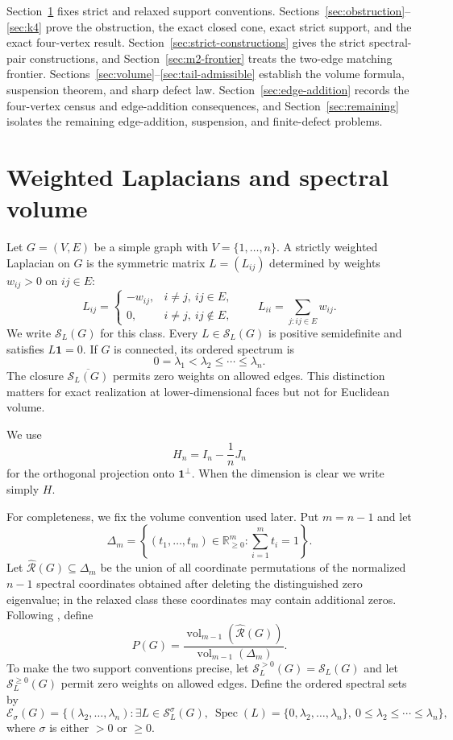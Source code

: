 \documentclass[11pt,reqno]{amsart}
\theoremstyle{definition}
\theoremstyle{remark}
\newcommand{\one}{\mathbf 1}
\newcommand{\R}{\mathbb R}
\newcommand{\SL}{\mathcal S_L}
\newcommand{\Spec}{\operatorname{Spec}}
\begin{document}
Section~\ref{sec:prelim} fixes strict and relaxed support conventions.
Sections~\ref{sec:obstruction}--\ref{sec:k4} prove the obstruction, the
exact closed cone, exact strict support, and the exact four-vertex result.
Section~\ref{sec:strict-constructions} gives the strict spectral-pair
constructions, and Section~\ref{sec:m2-frontier} treats the two-edge matching
frontier.
Sections~\ref{sec:volume}--\ref{sec:tail-admissible} establish the volume
formula, suspension theorem, and sharp defect law.  Section~\ref{sec:edge-addition}
records the four-vertex census and edge-addition consequences, and
Section~\ref{sec:remaining} isolates the remaining edge-addition,
suspension, and finite-defect problems.

\section{Weighted Laplacians and spectral volume}\label{sec:prelim}

Let $G=(V,E)$ be a simple graph with $V=\{1,\ldots,n\}$.  A strictly
weighted Laplacian on $G$ is the symmetric matrix $L=(L_{ij})$ determined by
weights $w_{ij}>0$ on $ij\in E$:
\[
  L_{ij}=
  \begin{cases}
    -w_{ij},&i\ne j,\ ij\in E,\\
    0,&i\ne j,\ ij\notin E,
  \end{cases}
  \qquad
  L_{ii}=\sum_{j:ij\in E}w_{ij}.
\]
We write $\SL(G)$ for this class.  Every $L\in\SL(G)$ is positive
semidefinite and satisfies $L\one=0$.  If $G$ is connected, its ordered
spectrum is
\[
  0=\lambda_1<\lambda_2\le\cdots\le\lambda_n.
\]
The closure $\overline{\SL(G)}$ permits zero weights on allowed edges.  This
distinction matters for exact realization at lower-dimensional faces but not
for Euclidean volume.

We use
\[
  H_n=I_n-\frac1nJ_n
\]
for the orthogonal projection onto $\one^\perp$.  When the dimension is clear
we write simply $H$.

For completeness, we fix the volume convention used later.  Put $m=n-1$ and
let
\[
  \Delta_m=\left\{(t_1,\ldots,t_m)\in\R_{\ge0}^m:
  \sum_{i=1}^m t_i=1\right\}.
\]
Let $\widehat{\mathcal R}(G)\subseteq\Delta_m$ be the union of all coordinate
permutations of the normalized $n-1$ spectral coordinates obtained after
deleting the distinguished zero eigenvalue; in the relaxed class these
coordinates may contain additional zeros.  Following
\cite[Section~8]{EJT2026}, define
\begin{equation}\label{eq:def-P}
  P(G)=\frac{\operatorname{vol}_{m-1}(\widehat{\mathcal R}(G))}
  {\operatorname{vol}_{m-1}(\Delta_m)}.
\end{equation}
To make the two support conventions precise, let $\SL^{>0}(G)=\SL(G)$ and
let $\SL^{\ge0}(G)$ permit zero weights on allowed edges.  Define the ordered
spectral sets by
\[
  \mathcal E_{\sigma}(G)=
  \{(\lambda_2,\ldots,\lambda_n):
  \exists L\in\SL^{\sigma}(G),\
  \Spec(L)=\{0,\lambda_2,\ldots,\lambda_n\},\
  0\le\lambda_2\le\cdots\le\lambda_n\},
\]
where $\sigma$ is either $>0$ or $\ge0$.
\end{document}
